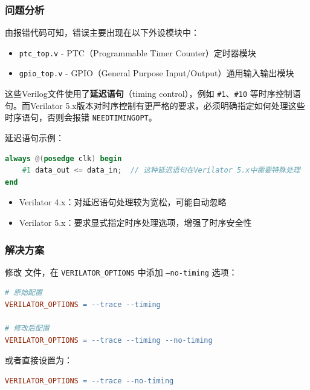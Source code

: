\documentclass[12pt,a4paper]{article}
\begin{document}
\subsubsection{问题分析}

由报错代码可知，错误主要出现在以下外设模块中：
\begin{itemize}[itemsep=0pt, parsep=3pt]
    \item \texttt{ptc\_top.v} - PTC（Programmable Timer Counter）定时器模块
    \item \texttt{gpio\_top.v} - GPIO（General Purpose Input/Output）通用输入输出模块
\end{itemize}



这些Verilog文件使用了\textbf{延迟语句}（timing control），例如 \texttt{\#1}、\texttt{\#10} 等时序控制语句。而Verilator 5.x版本对时序控制有更严格的要求，必须明确指定如何处理这些时序语句，否则会报错 \texttt{NEEDTIMINGOPT}。

延迟语句示例：
\begin{lstlisting}[language=Verilog]
always @(posedge clk) begin
    #1 data_out <= data_in;  // 这种延迟语句在Verilator 5.x中需要特殊处理
end
\end{lstlisting}


\begin{itemize}[itemsep=0pt, parsep=3pt]
    \item Verilator 4.x：对延迟语句处理较为宽松，可能自动忽略
    \item Verilator 5.x：要求显式指定时序处理选项，增强了时序安全性
\end{itemize}

\subsubsection{解决方案}

修改  文件，在 \texttt{VERILATOR\_OPTIONS} 中添加 \texttt{--no-timing} 选项：

\begin{lstlisting}[language=make]
# 原始配置
VERILATOR_OPTIONS = --trace --timing

# 修改后配置
VERILATOR_OPTIONS = --trace --timing --no-timing
\end{lstlisting}

或者直接设置为：

\begin{lstlisting}[language=make]
VERILATOR_OPTIONS = --trace --no-timing
\end{lstlisting}
\end{document}

